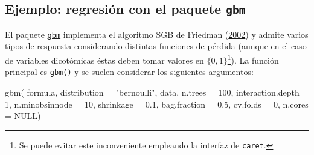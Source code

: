 \documentclass[
]{book}
\newenvironment{Shaded}{\begin{snugshade}}{\end{snugshade}}
\newcommand{\AttributeTok}[1]{\textcolor[rgb]{0.77,0.63,0.00}{#1}}
\newcommand{\ConstantTok}[1]{\textcolor[rgb]{0.00,0.00,0.00}{#1}}
\newcommand{\DecValTok}[1]{\textcolor[rgb]{0.00,0.00,0.81}{#1}}
\newcommand{\FloatTok}[1]{\textcolor[rgb]{0.00,0.00,0.81}{#1}}
\newcommand{\FunctionTok}[1]{\textcolor[rgb]{0.00,0.00,0.00}{#1}}
\newcommand{\NormalTok}[1]{#1}
\newcommand{\StringTok}[1]{\textcolor[rgb]{0.31,0.60,0.02}{#1}}
\theoremstyle{break}
\theoremstyle{nonumberplain}
\begin{document}
\hypertarget{ejemplo-regresiuxf3n-con-el-paquete-gbm}{%
\subsection{\texorpdfstring{Ejemplo: regresión con el paquete \texttt{gbm}}{Ejemplo: regresión con el paquete gbm}}\label{ejemplo-regresiuxf3n-con-el-paquete-gbm}}

El paquete \href{https://CRAN.R-project.org/package=gbm}{\texttt{gbm}} implementa el algoritmo SGB de Friedman (\protect\hyperlink{ref-friedman2002stochastic}{2002}) y admite varios tipos de respuesta considerando distintas funciones de pérdida (aunque en el caso de variables dicotómicas éstas deben tomar valores en \(\{0, 1\}\)\footnote{Se puede evitar este inconveniente empleando la interfaz de \texttt{caret}.}).
La función principal es \href{https://rdrr.io/pkg/gbm/man/gbm.html}{\texttt{gbm()}} y se suelen considerar los siguientes argumentos:

\begin{Shaded}
\begin{Highlighting}[]
\FunctionTok{gbm}\NormalTok{( formula, }\AttributeTok{distribution =} \StringTok{"bernoulli"}\NormalTok{, data, }\AttributeTok{n.trees =} \DecValTok{100}\NormalTok{, }
     \AttributeTok{interaction.depth =} \DecValTok{1}\NormalTok{, }\AttributeTok{n.minobsinnode =} \DecValTok{10}\NormalTok{,}
     \AttributeTok{shrinkage =} \FloatTok{0.1}\NormalTok{, }\AttributeTok{bag.fraction =} \FloatTok{0.5}\NormalTok{, }
     \AttributeTok{cv.folds =} \DecValTok{0}\NormalTok{, }\AttributeTok{n.cores =} \ConstantTok{NULL}\NormalTok{)}
\end{Highlighting}
\end{Shaded}
\end{document}
